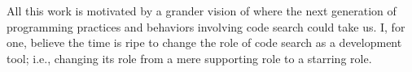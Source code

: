 All this work is motivated by a grander vision of where the next generation of programming practices and behaviors involving code search could take us. I, for one, believe the time is ripe to change the role of code search as a development tool; i.e., changing its role from a mere supporting role to a starring role.